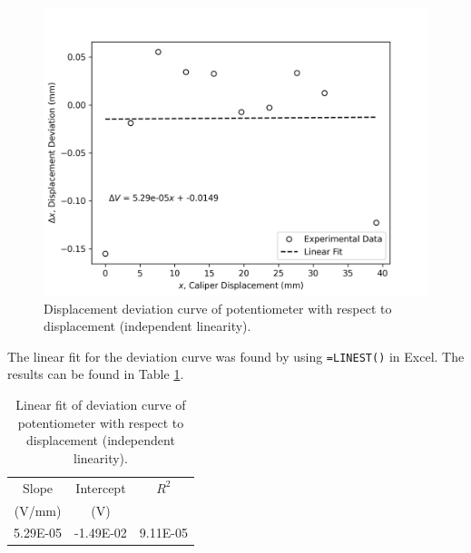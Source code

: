 \begin{figure}[h]
    \centering
    \includegraphics[width=0.8\linewidth]{matplotlib/Q1b.png}
    \caption{Displacement deviation curve of potentiometer with respect to displacement (independent linearity).}
    \label{fig:Q1b-deviation-curve}
\end{figure}

The linear fit for the deviation curve was found by using \texttt{=LINEST()} in Excel. The results can be found in Table \ref{tab:Q1b-deviation-curve-linear-fit}.


\begin{table}[h]
    \centering
    \caption{Linear fit of deviation curve of potentiometer with respect to displacement (independent linearity).}
    \label{tab:Q1b-deviation-curve-linear-fit}
    \begin{tabular}{ccc}
        \hline
        Slope & Intercept & $R^2$ \\
        (V/mm) & (V) & \\
        \midrule
        5.29E-05 & -1.49E-02 & 9.11E-05 \\
        \hline
    \end{tabular}
\end{table}
